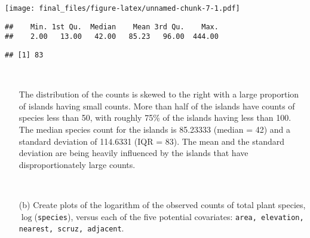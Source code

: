 \documentclass[]{article}
\newenvironment{Shaded}{\begin{snugshade}}{\end{snugshade}}
\newcommand{\KeywordTok}[1]{\textcolor[rgb]{0.13,0.29,0.53}{\textbf{#1}}}
\newcommand{\OperatorTok}[1]{\textcolor[rgb]{0.81,0.36,0.00}{\textbf{#1}}}
\newcommand{\NormalTok}[1]{#1}
\begin{document}
\texttt{[image: final\_files/figure-latex/unnamed-chunk-7-1.pdf]}

\begin{Shaded}
\end{Shaded}

\begin{verbatim}
##    Min. 1st Qu.  Median    Mean 3rd Qu.    Max. 
##    2.00   13.00   42.00   85.23   96.00  444.00
\end{verbatim}

\begin{verbatim}
## [1] 83
\end{verbatim}

~

\begin{itemize} \item[] 
The distribution of the counts is skewed to the right with a large proportion of islands having small counts. More than half of the islands have counts of species less than 50, with roughly 75\% of the islands having less than 100. The median species count for the islands is 85.23333 (median = 42) and a standard deviation of 114.6331 (IQR = 83). The mean and the standard deviation are being heavily influenced by the islands that have disproportionately large counts.
\end{itemize}

~

\begin{itemize}
\item[(b)] Create plots of the logarithm of the observed counts of total plant species, $\log$({\tt species}), versus each of the five potential covariates: {\tt area, elevation, nearest, scruz, adjacent}. 
\end{itemize}

~
\end{document}
